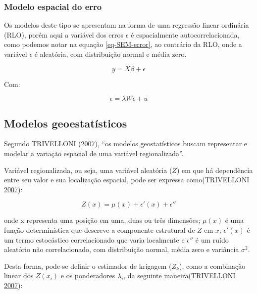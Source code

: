\documentclass[12pt,]{article}
\begin{document}
\subsubsection{Modelo espacial do erro}\label{modelo-espacial-do-erro}

Os modelos deste tipo se apresentam na forma de uma regressão linear
ordinária (RLO), porém aqui a variável dos erros \(\epsilon\) é
espacialmente autocorrelacionada, como podemos notar na equação
\ref{eq-SEM-error}, ao contrário da RLO, onde a variável \(\epsilon\) é
aleatória, com distribuição normal e média zero.

\begin{equation}
  \label{eq-SEM}
  y = X\beta + \epsilon
\end{equation}

Com:

\begin{equation}
  \label{eq-SEM-error}
  \epsilon = \lambda W \epsilon + u
\end{equation}

\subsection{Modelos geoestatísticos}\label{modelos-geoestatisticos}

Segundo TRIVELLONI (\protect\hyperlink{ref-trivelloni07}{2007}), ``os
modelos geostatísticos buscam representar e modelar a variação espacial
de uma variável regionalizada''.

Variável regionalizada, ou seja, uma variável aleatória (\(Z\)) em que
há dependência entre seu valor e sua localização espacial, pode ser
expressa como(TRIVELLONI \protect\hyperlink{ref-trivelloni07}{2007}):

\begin{equation}
  \label{eq-regional}
  Z(x) = \mu(x) + \epsilon'(x) + \epsilon''
\end{equation}

onde x representa uma posição em uma, duas ou três dimensões; \(\mu(x)\)
é uma função determinística que descreve a componente estrutural de
\(Z\) em \(x\); \(\epsilon'(x)\) é um termo estocástico correlacionado
que varia localmente e \(\epsilon''\) é um ruído aleatório não
correlacionado, com distribuição normal, média zero e variância
\(\sigma^2\).

Desta forma, pode-se definir o estimador de krigagem (\(Z_k\)), como a
combinação linear dos \(Z(x_i)\) e os ponderadores \(\lambda_i\), da
seguinte maneira(TRIVELLONI \protect\hyperlink{ref-trivelloni07}{2007}):
\end{document}
